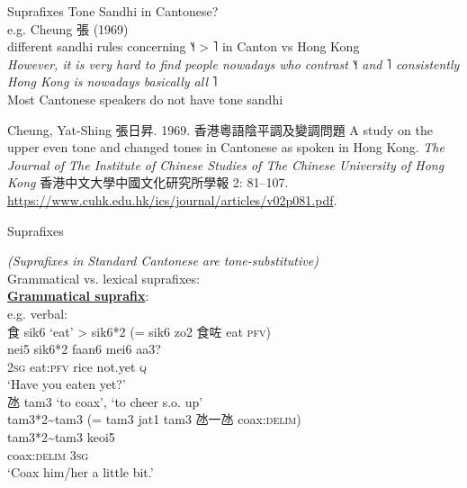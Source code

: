 \documentclass{beamer}
\begin{document}
\begin{frame}[fragile]{Suprafixes}
Tone Sandhi in Cantonese?\\
\bigskip
e.g. Cheung 張 (1969)\\ 
different sandhi rules concerning ˥˧ > ˥ in Canton vs Hong Kong\\
\medskip
\emph{However, it is very hard to find people nowadays who contrast ˥˧ and ˥ consistently\\
\quad Hong Kong is nowadays basically all ˥}\\
\smallskip
Most Cantonese speakers do not have tone sandhi

\vfill {} {\tiny Cheung, Yat-Shing 張日昇. 1969. 香港粵語陰平調及變調問題 A study on the upper
even tone and changed tones in Cantonese as spoken in Hong Kong. \emph{The Journal of The Institute of Chinese Studies of The Chinese
University of Hong Kong} 香港中文大學中國文化研究所學報 2: 81–107. \url{https://www.cuhk.edu.hk/ics/journal/articles/v02p081.pdf}.} 

\end{frame}

\begin{frame}[fragile]{Suprafixes}

{\small \emph{(Suprafixes in Standard Cantonese are tone-substitutive)}}\\
Grammatical vs. lexical suprafixes:\\
\textbf{\underline{Grammatical suprafix}}:\\

\medskip
e.g. verbal:\\
\medskip
食 sik6 \enquote*{eat} > sik6*2 (= sik6 zo2 食咗  eat \textsc{pfv})\\
\smallskip
nei5 sik6*2 faan6 mei6 aa3?\\
\textsc{2sg} eat:\textsc{pfv} rice not.yet \textsc{q}\\
\enquote*{Have you eaten yet?}\\
\bigskip
氹 tam3 \enquote*{to coax}, \enquote*{to cheer s.o. up}\\
tam3*2\~{}tam3 (= tam3 jat1 tam3 氹一氹 coax:\textsc{delim})\\
\smallskip
tam3*2\~{}tam3 keoi5\\
coax:\textsc{delim} \textsc{3sg}\\
\enquote*{Coax him/her a little bit.}

\end{frame}
\end{document}
